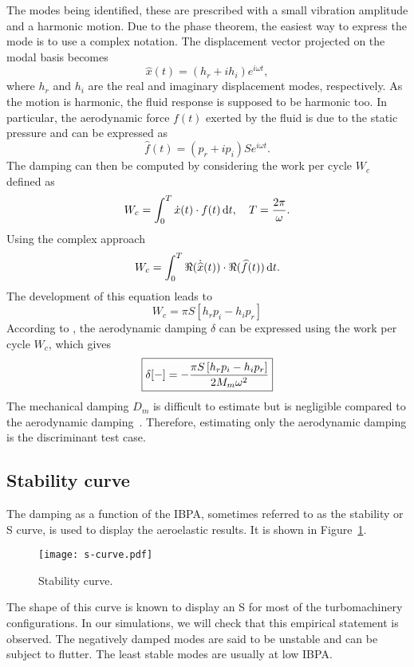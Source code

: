The modes being identified, these are prescribed
with a small vibration amplitude and a harmonic motion.
Due to the phase theorem, the easiest way to express
the mode is to use a complex notation.
The displacement vector projected on the modal basis becomes
\begin{equation}
   \widehat{x}(t) = (h_r + i h_i) e^{i \omega t},
   \label{eq:harm_vib_displ_vector}
\end{equation}
where $h_r$ and $h_i$ are the real and imaginary displacement
modes, respectively.
As the motion is harmonic, the fluid response is
supposed to be harmonic too.
In particular, the aerodynamic force $f (t)$ exerted by the fluid is due to the
static pressure and can be expressed as
\begin{equation}
    \widehat{f}(t) = (p_r + i p_i) S e^{i \omega t}.
\end{equation}
The damping can then be computed by considering the 
work per cycle $W_c$ defined as
\begin{equation}
    W_c = \int_0^T \dot{x} (t) \cdot f(t) \mathop{}\!\mathrm{d} t, \quad T = \frac{2 \pi}{\omega}.
\end{equation}
Using the complex approach
\begin{equation}
    W_c = \int_0^T \Re (\dot{\widehat{x}} (t)) \cdot \Re (\widehat{f}(t)) \mathop{}\!\mathrm{d} t.
\end{equation}
The development of this equation leads to
\begin{equation}
    W_c = \pi S \left[h_r p_i - h_i p_r \right]
\end{equation}
According to \citet{Carta1967}, the aerodynamic 
damping $\delta$ can be expressed using the
work per cycle $W_c$, which gives
\begin{equation}
    \fbox{$
    \delta [-] = - \displaystyle \frac{\pi S \left[h_r p_i - h_i p_r \right]}{2 M_m \omega^2}
    $}
\end{equation}
The mechanical damping $D_m$ is difficult to estimate
but is negligible compared to the aerodynamic damping~\cite{Mikolajczak1975}.
Therefore, estimating only the aerodynamic damping is the discriminant test case.

\subsection{Stability curve}
\label{sub:s_curve}

The damping as a function of the IBPA, sometimes
referred to as the stability or S curve, is used to
display the aeroelastic results. It is shown in
Figure~\ref{fig:s-curve}. 
\begin{figure}[htp]
  \centering
  \texttt{[image: s-curve.pdf]}
  \caption{Stability curve.}
  \label{fig:s-curve}
\end{figure}
The shape of this curve is
known to display an S for most of the
turbomachinery configurations. 
In our simulations, we will check that this empirical
statement is observed.
The negatively damped modes are said to
be unstable and can be subject to flutter. 
The least stable modes are usually at low IBPA.

